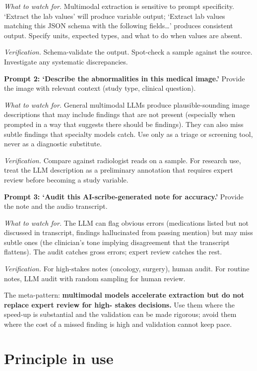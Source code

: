 \documentclass[
  letterpaper,
  11pt]{scrbook}
\begin{document}
\emph{What to watch for.} Multimodal extraction is sensitive to prompt
specificity. `Extract the lab values' will produce variable output;
`Extract lab values matching this JSON schema with the following
fields\ldots{}' produces consistent output. Specify units, expected
types, and what to do when values are absent.

\emph{Verification.} Schema-validate the output. Spot-check a sample
against the source. Investigate any systematic discrepancies.

\textbf{Prompt 2: `Describe the abnormalities in this medical image.'}
Provide the image with relevant context (study type, clinical question).

\emph{What to watch for.} General multimodal LLMs produce
plausible-sounding image descriptions that may include findings that are
not present (especially when prompted in a way that suggests there
should be findings). They can also miss subtle findings that specialty
models catch. Use only as a triage or screening tool, never as a
diagnostic substitute.

\emph{Verification.} Compare against radiologist reads on a sample. For
research use, treat the LLM description as a preliminary annotation that
requires expert review before becoming a study variable.

\textbf{Prompt 3: `Audit this AI-scribe-generated note for accuracy.'}
Provide the note and the audio transcript.

\emph{What to watch for.} The LLM can flag obvious errors (medications
listed but not discussed in transcript, findings hallucinated from
passing mention) but may miss subtle ones (the clinician's tone implying
disagreement that the transcript flattens). The audit catches gross
errors; expert review catches the rest.

\emph{Verification.} For high-stakes notes (oncology, surgery), human
audit. For routine notes, LLM audit with random sampling for human
review.

The meta-pattern: \textbf{multimodal models accelerate extraction but do
not replace expert review for high- stakes decisions.} Use them where
the speed-up is substantial and the validation can be made rigorous;
avoid them where the cost of a missed finding is high and validation
cannot keep pace.

\section{Principle in use}\label{principle-in-use-6}
\end{document}
